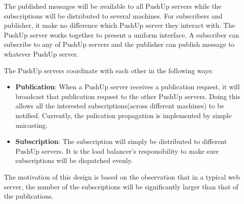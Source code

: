 The published messages will be available to all PushUp servers while the
subscriptions will be distributed to several machines. For 
subscribers and publisher, it make no difference which PushUp server they interact 
with.  The PushUp server works together to present
a uniform interface. A subscriber can subscribe to any of PushUp 
servers and the publisher can publish message to whatever PushUp server. 

The PushUp servers coordinate with each other in the following ways:

\begin{itemize}
    \item {\bf Publication}: When a PushUp server receives a publication request, it
          will broadcast that publication request to the other PushUp servers. Doing
          this allows all the interested subscriptions(across different machines) to 
          be notified. Currently, the pulication propagation is implemented by 
          simple unicasting.
    \item {\bf Subscription}: The subscription will simply be distributed to different
          PushUp servers. It is the load balancer's responsibility to make sure 
          subscriptions will be dispatched evenly.
\end{itemize}

The motivation of this design is based on the observation that in a typical web server,
the number of the subscriptions will be significantly larger than that of the publications.

